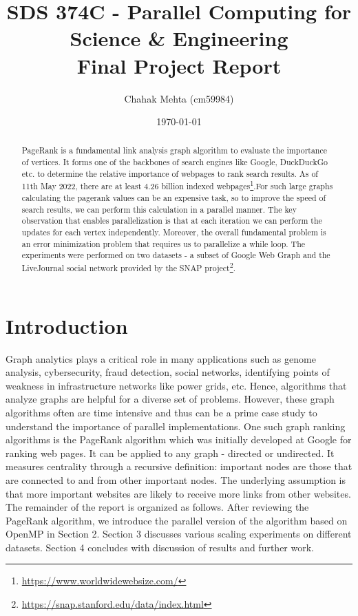 \documentclass[11pt]{article}
\author{Chahak Mehta (cm59984)}
\date{\today}
\title{SDS 374C - Parallel Computing for Science \& Engineering\\\medskip
\large Final Project Report}
\begin{document}
\maketitle
\begin{abstract}
PageRank is a fundamental link analysis graph algorithm to evaluate the importance of vertices. It forms one of the backbones of search engines like Google, DuckDuckGo etc. to determine the relative importance of webpages to rank search results. As of 11th May 2022, there are at least 4.26 billion indexed webpages\footnote{\url{https://www.worldwidewebsize.com/}}.For such large graphs calculating the pagerank values can be an expensive task, so to improve the speed of search results, we can perform this calculation in a parallel manner. The key observation that enables parallelization is that at each iteration we can perform the updates for each vertex independently. Moreover, the overall fundamental problem is an error minimization problem that requires us to parallelize a while loop. The experiments were performed on two datasets - a subset of Google Web Graph and the LiveJournal social network provided by the SNAP project\footnote{\url{https://snap.stanford.edu/data/index.html}\label{orgbe57fc3}}.
\end{abstract}

\section{Introduction}
\label{sec:org7fa7590}
Graph analytics plays a critical role in many applications such as genome analysis, cybersecurity, fraud detection, social networks, identifying points of weakness in infrastructure networks like power grids, etc. Hence, algorithms that analyze graphs are helpful for a diverse set of problems. However, these graph algorithms often are time intensive and thus can be a prime case study to understand the importance of parallel implementations. One such graph ranking algorithms is the PageRank algorithm which was initially developed at Google for ranking web pages. It can be applied to any graph - directed or undirected. It measures centrality through a recursive definition: important nodes are those that are connected to and from other important nodes. The underlying assumption is that more important websites are likely to receive more links from other websites. The remainder of the report is organized as follows. After reviewing the PageRank algorithm, we introduce the parallel version of the algorithm based on OpenMP in Section 2. Section 3 discusses various scaling experiments on different datasets. Section 4 concludes with discussion of results and further work.
\end{document}
